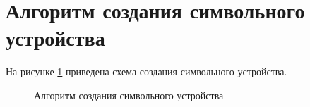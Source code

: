 \section{Алгоритм создания символьного устройства}

На рисунке \ref{fig:dev} приведена схема создания символьного устройства.

\begin{figure}[ph!]
	\caption{Алгоритм создания символьного устройства}
	\label{fig:dev}
\end{figure}

